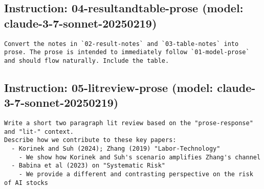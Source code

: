 \subsection*{Instruction: 04-resultandtable-prose  (model: claude-3-7-sonnet-20250219)}
\vspace{-1ex}
\begin{lstlisting}[language=text,breaklines=true,frame=single]
Convert the notes in `02-result-notes` and `03-table-notes` into prose. The prose is intended to immediately follow `01-model-prose` and should flow naturally. Include the table.

\end{lstlisting}
\vspace{-3ex}
\subsection*{Instruction: 05-litreview-prose  (model: claude-3-7-sonnet-20250219)}
\vspace{-1ex}
\begin{lstlisting}[language=text,breaklines=true,frame=single]
Write a short two paragraph lit review based on the "prose-response" and "lit-" context. 
Describe how we contribute to these key papers:
  - Korinek and Suh (2024); Zhang (2019) "Labor-Technology"
    - We show how Korinek and Suh's scenario amplifies Zhang's channel
  - Babina et al (2023) on "Systematic Risk"
    - We provide a different and contrasting perspective on the risk of AI stocks    

\end{lstlisting}
\vspace{-3ex}
